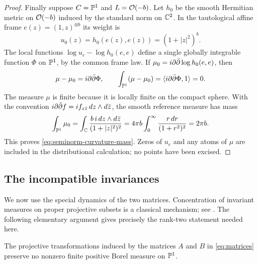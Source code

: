 \begin{proof}
Finally suppose $C=\mathbb P^1$ and $L=\mathcal O(-b)$.  Let $h_0$ be the smooth
Hermitian metric on $\mathcal O(-b)$ induced by the standard norm on $\mathbb C^2$.
In the tautological affine frame $e(z)=(1,z)^{\otimes b}$ its weight is
\[
 u_0(z)=h_0(e(z),e(z))=(1+|z|^2)^b.
\]
The local functions $\log u_e-\log h_0(e,e)$ define a single globally
integrable function $\Phi$ on $\mathbb P^1$, by the common frame law.
If $\mu_0=i\partial\bar\partial\log h_0(e,e)$, then
\[
 \mu-\mu_0=i\partial\bar\partial\Phi,
 \qquad
 \int_{\mathbb P^1}(\mu-\mu_0)
   =\langle i\partial\bar\partial\Phi,1\rangle=0.
\]
The measure $\mu$ is finite because it is locally finite on the compact
sphere.  With the convention
$i\partial\bar\partial f=i f_{z\bar z}\,dz\wedge d\bar z$, the smooth reference measure
has mass
\[
 \int_{\mathbb P^1}\mu_0
 =\int_{\mathbb C}\frac{b\,i\,dz\wedge d\bar z}{(1+|z|^2)^2}
 =4\pi b\int_0^\infty\frac{r\,dr}{(1+r^2)^2}
 =2\pi b.
\]
This proves \eqref{eq:seminorm-curvature-mass}.  Zeros of $u_e$ and any
atoms of $\mu$ are included in the distributional calculation; no
points have been excised.
\end{proof}

\subsection{The incompatible invariances}

We now use the special dynamics of the two matrices. Concentration
of invariant measures on proper projective subsets is a classical
mechanism; see \cite[Lemma~2 and the proof of Lemma~3]{Furstenberg1976}.
The following elementary argument gives precisely the rank-two
statement needed here.

\begin{lemma}
\label{lem:no-invariant-measure}
The projective transformations induced by the matrices $A$ and $B$ in
\eqref{eq:matrices} preserve no nonzero finite positive
Borel measure on $\mathbb P^1$.
\end{lemma}

